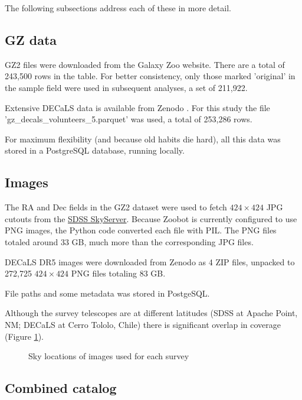 \documentclass[twocolumn, twocolappendix, tighten]{aastex631}
\begin{document}
The following subsections address each of these in more detail.

\subsection{GZ data}

GZ2 files were downloaded from the Galaxy Zoo website.
There are a total of 243,500 rows in the table. For better consistency, only those marked 'original' in the sample field were used in subsequent analyses, a set of 211,922.

Extensive DECaLS data is available from Zenodo \citep{walmsley_mike_2020_4573248}. For this study the file 'gz\_decals\_volunteers\_5.parquet' was used, a total of 253,286 rows.

For maximum flexibility (and because old habits die hard), all this data was stored in a PostgreSQL database, running locally.

\subsection{Images} \label{images}

The RA and Dec fields in the GZ2 dataset were used to fetch $424 \times 424$ JPG cutouts from the \href{http://skyserver.sdss.org/dr14/SkyServerWS/ImgCutout/getjpeg}{SDSS SkyServer}. Because Zoobot is currently configured to use PNG images, the Python code converted each file with PIL. The PNG files totaled around 33 GB, much more than the corresponding JPG files.

DECaLS DR5 images were downloaded from Zenodo \citep{walmsley_mike_2020_4573248} as 4 ZIP files, unpacked to 272,725 $424 \times 424$ PNG files totaling 83 GB. 

File paths and some metadata was stored in PostgeSQL.

Although the survey telescopes are at different latitudes (SDSS at Apache Point, NM; DECaLS at Cerro Tololo, Chile) there is significant overlap in coverage (Figure \ref{fig:coverage}).

\begin{figure}[htb!]
	\caption{Sky locations of images used for each survey
		\label{fig:coverage}}
\end{figure}



\subsection{Combined catalog}
\end{document}
